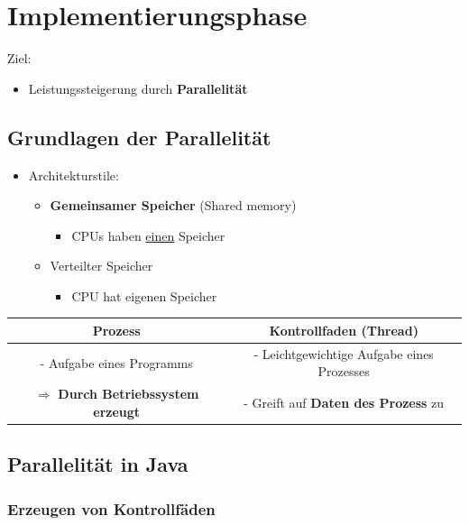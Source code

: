 \section{Implementierungsphase}
	
	Ziel:				
	\begin{itemize}
		\item Leistungssteigerung durch \textbf{Parallelität}
	\end{itemize}
	
	\subsection{Grundlagen der Parallelität}
		
		\begin{itemize}
			\item Architekturstile:
			\begin{itemize}
				\item \textbf{Gemeinsamer Speicher} (Shared memory)
				\begin{itemize}
					\item CPUs haben \underline{einen} Speicher
				\end{itemize}
				\item Verteilter Speicher
				\begin{itemize}
					\item CPU hat eigenen Speicher
				\end{itemize}
			\end{itemize}
		\end{itemize}
				
		\begin{center}
			\begin{tabular}{c|c}
				Prozess                                             & Kontrollfaden (Thread) \\
				\hline
				- Aufgabe eines Programms                           & - Leichtgewichtige Aufgabe eines Prozesses \\
				$\Rightarrow$ \textbf{Durch Betriebssystem erzeugt} & - Greift auf \textbf{Daten des Prozess} zu \\
			\end{tabular}
		\end{center}
		
	\subsection{Parallelität in Java}
			
		\subsubsection{Erzeugen von Kontrollfäden}
					
